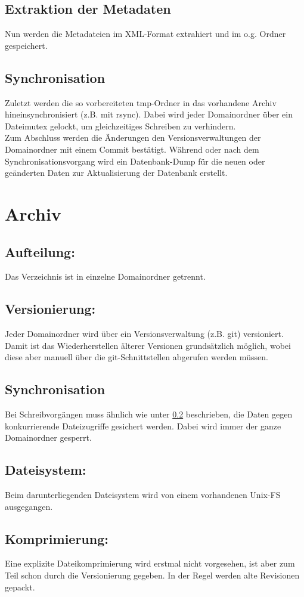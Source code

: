 \subsection{Extraktion der Metadaten}\label{l:spec:crawler:extraction}
	Nun werden die Metadateien im XML-Format extrahiert und im o.g. Ordner gespeichert.
\subsection{Synchronisation}\label{l:spec:crawler:sync}
	Zuletzt werden die so vorbereiteten tmp-Ordner in das vorhandene Archiv hineinsynchronisiert (z.B. mit rsync). 
	Dabei wird jeder Domainordner über ein Dateimutex gelockt, um gleichzeitiges Schreiben zu verhindern. \\
	Zum Abschluss werden die Änderungen den Versionsverwaltungen der Domainordner mit einem Commit bestätigt.
	Während oder nach dem Synchronisationsvorgang wird ein Datenbank-Dump für die neuen oder geänderten Daten
	zur Aktualisierung der Datenbank erstellt.

\section{Archiv}
\subsection{Aufteilung:}
	Das Verzeichnis ist in einzelne Domainordner getrennt. 
\subsection{Versionierung:}
	Jeder Domainordner wird über ein Versionsverwaltung (z.B. git) versioniert. 
	Damit ist das Wiederherstellen älterer Versionen grundsätzlich möglich,
	wobei diese aber manuell über die git-Schnittstellen abgerufen werden müssen.
\subsection{Synchronisation}
	Bei Schreibvorgängen muss ähnlich wie unter \ref{l:spec:crawler:sync} beschrieben, 
	die Daten gegen konkurrierende Dateizugriffe gesichert werden.
	Dabei wird immer der ganze Domainordner gesperrt.
\subsection{Dateisystem:} 
	Beim darunterliegenden Dateisystem wird von einem vorhandenen Unix-FS ausgegangen.
\subsection{Komprimierung:} 
	Eine explizite Dateikomprimierung wird erstmal nicht vorgesehen, ist aber zum Teil schon durch die Versionierung gegeben.
	In der Regel werden alte Revisionen gepackt.

